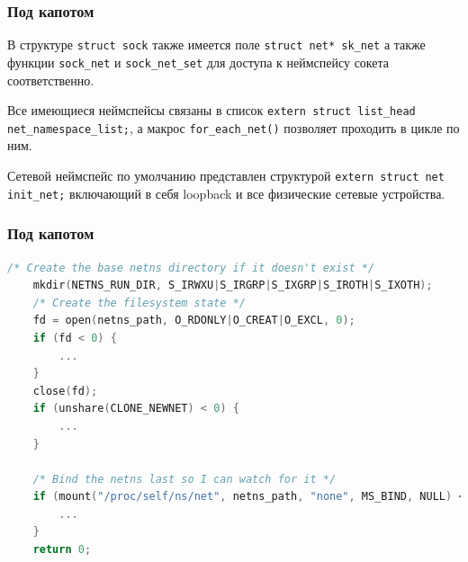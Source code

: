 \begin{frame}[fragile]
\frametitle{Под капотом}
    \begin{block}{}
    В структуре \texttt{struct sock} также имеется поле \texttt{struct net* sk\_net} а также функции \texttt{sock\_net} и \texttt{sock\_net\_set} для доступа к неймспейсу сокета соответственно.

    Все имеющиеся неймспейсы связаны в список \texttt{extern struct list\_head net\_namespace\_list;}, а макрос \texttt{for\_each\_net()} позволяет проходить в цикле по ним.

    Сетевой неймспейс по умолчанию представлен структурой \texttt{extern struct net init\_net;} включающий в себя loopback и все физические сетевые устройства. 
\end{block}
\end{frame}

\begin{frame}[fragile]
\frametitle{Под капотом}
\begin{block}{}
    \begin{lstlisting}[title=\href{https://github.com/shemminger/iproute2/blob/master/ip/ipnetns.c}{ipnetns.c}, language=c, basicstyle={\fontsize{6}{6}\ttfamily}]
    /* Create the base netns directory if it doesn't exist */
	mkdir(NETNS_RUN_DIR, S_IRWXU|S_IRGRP|S_IXGRP|S_IROTH|S_IXOTH);
	/* Create the filesystem state */
	fd = open(netns_path, O_RDONLY|O_CREAT|O_EXCL, 0);
	if (fd < 0) {
		...	
    }
	close(fd);
	if (unshare(CLONE_NEWNET) < 0) {
		...	
    }

	/* Bind the netns last so I can watch for it */
	if (mount("/proc/self/ns/net", netns_path, "none", MS_BIND, NULL) < 0) {
		...
    }
	return 0;
\end{lstlisting}
\end{block}
\end{frame}

